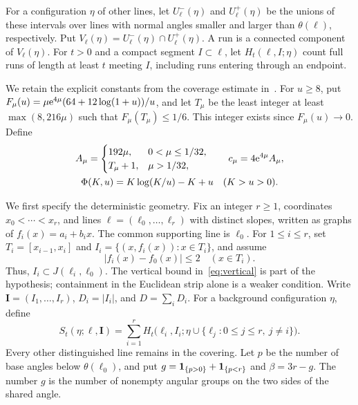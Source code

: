 \documentclass[11pt,letterpaper]{article}
\begin{document}
For a configuration $\eta$ of other lines, let $U_\ell^-(\eta)$ and $U_\ell^+(\eta)$ be the unions of these intervals over lines with normal angles smaller and larger than $\theta(\ell)$, respectively. Put $V_\ell(\eta)=U_\ell^-(\eta)\cap U_\ell^+(\eta)$. A run is a connected component of $V_\ell(\eta)$. For $t>0$ and a compact segment $I\subset\ell$, let $H_t(\ell,I;\eta)$ count full runs of length at least $t$ meeting $I$, including runs entering through an endpoint.

We retain the explicit constants from the coverage estimate in~\cite{CR26}. For $u\ge8$, put $F_\mu(u)=\mu\mathrm{e}^{4\mu}(64+12\log(1+u))/u$, and let $T_\mu$ be the least integer at least $\max(8,216\mu)$ such that $F_\mu(T_\mu)\le1/6$. This integer exists since $F_\mu(u)\to0$. Define
\[
\begin{gathered}
 A_\mu=\begin{cases}192\mu,&0<\mu\le1/32,\\T_\mu+1,&\mu>1/32,\end{cases}
 \qquad c_\mu=4\mathrm{e}^{4\mu}A_\mu,\\
 \Phi(K,u)=K\log(K/u)-K+u\quad(K>u>0).
\end{gathered}
\]

We first specify the deterministic geometry. Fix an integer $r\ge1$, coordinates $x_0<\cdots<x_r$, and lines $\boldsymbol\ell=(\ell_0,\ldots,\ell_r)$ with distinct slopes, written as graphs of $f_i(x)=a_i+b_ix$. The common supporting line is $\ell_0$. For $1\le i\le r$, set $T_i=[x_{i-1},x_i]$ and $I_i=\{(x,f_i(x)):x\in T_i\}$, and assume
\begin{equation}\label{eq:vertical}
 |f_i(x)-f_0(x)|\le2\quad(x\in T_i).
\end{equation}
Thus, $I_i\subset J(\ell_i,\ell_0)$. The vertical bound in~\eqref{eq:vertical} is part of the hypothesis; containment in the Euclidean strip alone is a weaker condition. Write $\boldsymbol I=(I_1,\ldots,I_r)$, $D_i=|I_i|$, and $D=\sum_iD_i$. For a background configuration $\eta$, define
\begin{equation}\label{eq:S}
 S_t(\eta;\boldsymbol\ell,\boldsymbol I)
 =\sum_{i=1}^r H_t\big(\ell_i,I_i;
       \eta\cup\{\ell_j:0\le j\le r,\ j\ne i\}\big).
\end{equation}
Every other distinguished line remains in the covering. Let $p$ be the number of base angles below $\theta(\ell_0)$, and put $g=\mathbf{1}_{\{p>0\}}+\mathbf{1}_{\{p<r\}}$ and $\beta=3r-g$. The number $g$ is the number of nonempty angular groups on the two sides of the shared angle.
\end{document}
